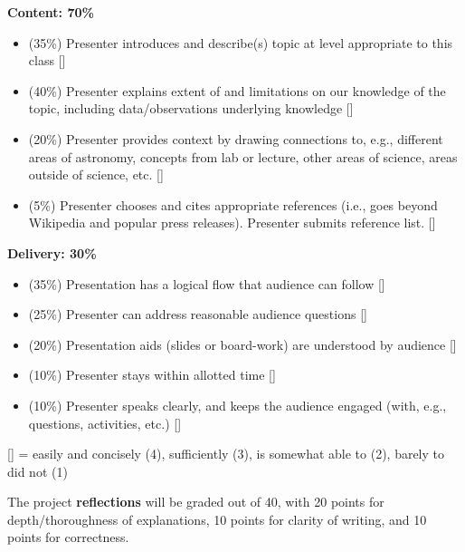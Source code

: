 \documentclass[11pt]{article}
\begin{document}
\noindent
\textbf{Content: 70\%}
\begin{itemize}
\item (35\%) Presenter introduces and describe(s) topic at level appropriate to this class [\underline{\hspace{5mm}}]
\item (40\%) Presenter explains extent of and limitations on our knowledge of the topic, including data/observations underlying knowledge [\underline{\hspace{5mm}}]
\item (20\%) Presenter provides context by drawing connections to, e.g., different areas of astronomy, concepts from lab or
lecture, other areas of science, areas outside of science, etc. [\underline{\hspace{5mm}}]
\item (5\%) Presenter chooses and cites appropriate references (i.e., goes beyond Wikipedia and popular press releases).  Presenter submits reference list. [\underline{\hspace{5mm}}]
\end{itemize} 

\noindent
\textbf{Delivery: 30\%}
\begin{itemize}
\item (35\%) Presentation has a logical flow that audience can follow [\underline{\hspace{5mm}}]
\item (25\%) Presenter can address reasonable audience questions [\underline{\hspace{5mm}}]
\item (20\%) Presentation aids (slides or board-work) are understood by audience [\underline{\hspace{5mm}}]
\item (10\%) Presenter stays within allotted time [\underline{\hspace{5mm}}]
\item (10\%) Presenter speaks clearly, and keeps the audience engaged (with, e.g., questions, activities, etc.) [\underline{\hspace{5mm}}]
\end{itemize}
{\small [\underline{\hspace{5mm}}] = easily and concisely (4), sufficiently (3),
is somewhat able to (2), barely to did not (1)
}

\bigskip \bigskip
\noindent
The project \textbf{reflections} will be graded out of 40, with 20 points for depth/thoroughness of explanations, 10 points for clarity of writing, and 10 points for correctness.
\end{document}
